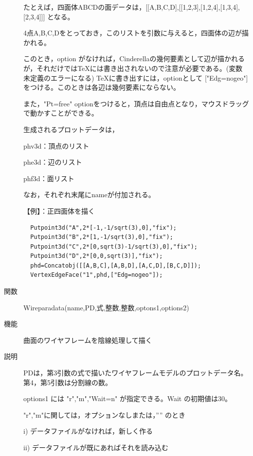 \documentclass[papersize,a4paper,12pt,uplatex]{jsarticle}
\begin{document}
\begin{description}
たとえば，四面体ABCDの面データは，[[A,B,C,D],[[1,2,3],[1,2,4],[1,3,4],[2,3,4]]] となる。

4点A,B,C,Dをとっておき，このリストを引数に与えると，四面体の辺が描かれる。

このとき，option がなければ，Cinderellaの幾何要素として辺が描かれるが，それだけではTeXには書き出されないので注意が必要である。(変数未定義のエラーになる)  TeXに書き出すには，optionとして ["Edg=nogeo"] をつける。このときは各辺は幾何要素にならない。

また，"Pt=free" optionをつけると，頂点は自由点となり，マウスドラッグで動かすことができる。

生成されるプロットデータは，

phv3d：頂点のリスト

phe3d：辺のリスト

phf3d：面リスト

なお，それぞれ末尾にnameが付加される。

\vspace{\baselineskip}
【例】：正四面体を描く
\begin{verbatim}
  Putpoint3d("A",2*[-1,-1/sqrt(3),0],"fix");
  Putpoint3d("B",2*[1,-1/sqrt(3),0],"fix");
  Putpoint3d("C",2*[0,sqrt(3)-1/sqrt(3),0],"fix");
  Putpoint3d("D",2*[0,0,sqrt(3)],"fix");
  phd=Concatobj([[A,B,C],[A,B,D],[A,C,D],[B,C,D]]);
  VertexEdgeFace("1",phd,["Edg=nogeo"]);
\end{verbatim}
        \begin{center}  \end{center}

\hypertarget{wireparadata}{}
\item[関数]  Wireparadata(name,PD,式,整数,整数,optons1,options2)
\item[機能]  曲面のワイヤフレームを陰線処理して描く
\item[説明]  PDは，第3引数の式で描いたワイヤフレームモデルのプロットデータ名。第4，第5引数は分割線の数。

options1 には "r","m","Wait=n" が指定できる。Wait の初期値は30。

  "r","m"に関しては，オプションなしまたは，”” のとき
  
    i) データファイルがなければ，新しく作る
    
    ii) データファイルが既にあればそれを読み込む
    

\end{description}
\end{document}
